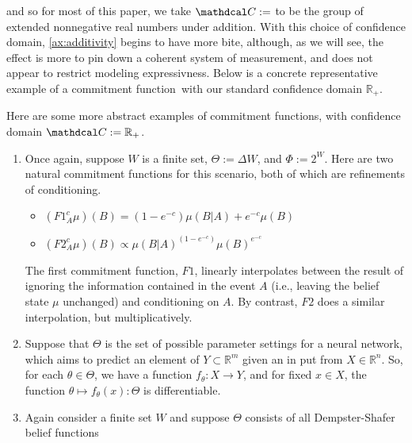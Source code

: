 \documentclass{article}
\def\cofunc{commitment function}
\def\confdom{\mathdcal C}
\begin{document}
and so for most of this paper, we take $\confdom := $ to be the group of extended nonnegative real numbers under addition.
With this choice of confidence domain, \cref{ax:additivity} begins to have more bite, although, as we will see, the effect is more to pin down a coherent system of measurement, and does not appear to restrict modeling expressivness.
%
%
Below is a concrete representative example of a \cofunc\ with our standard confidence domain $\mathbb R_+$.


Here are some more abstract examples of \cofunc s, with confidence domain
$\confdom := \mathbb R_+$.
\begin{enumerate}
\item
Once again, suppose $W$ is a finite set,
$\Theta := \Delta W$, and $\Phi := 2^W$.
Here are two natural \cofunc s for this scenario, both of which are refinements of conditioning.
\begin{itemize}
    \item
    $\displaystyle
        (F1^c_A \mu)(B) = (1-e^{-c}) \mu(B|A) +  e^{-c} \mu(B)
    $
    \item
    $\displaystyle
        (F2^c_A \mu)(B) \propto \mu(B|A)^{(1-e^{-c})} \mu(B)^{e^{-c}}
    $
\end{itemize}
The first \cofunc, $F1$, linearly interpolates between the result of ignoring the information contained in the event $A$ (i.e., leaving the belief state $\mu$ unchanged) and conditioning on $A$.
By contrast, $F2$ does a similar interpolation, but multiplicatively.

\item
Suppose that $\Theta$ is the set of possible parameter settings for a neural network, which aims to predict an element of $Y \subset \mathbb R^{m}$ given an in put from $X \in \mathbb R^{n}$.
So, for each $\theta \in \Theta$, we have a function $f_\theta : X \to Y$, and for fixed $x \in X$, the function $\theta \mapsto f_\theta(x) : \Theta$ is differentiable.




\item
Again consider a finite set $W$ and suppose $\Theta$ consists of all Dempster-Shafer belief functions
\end{enumerate}
\end{document}
